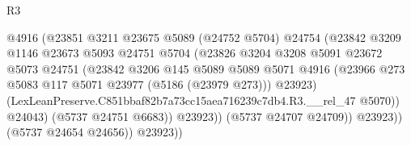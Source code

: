 \begin{lexlean}{R3}
\begin{coremodule}
                                            @4916
                                            (@23851
                                              @3211
                                              @23675
                                              @5089
                                              (@24752 @5704)
                                              @24754
                                              (@23842
                                                @3209
                                                @1146
                                                @23673
                                                @5093
                                                @24751
                                                @5704
                                                (@23826
                                                  @3204
                                                  @3208
                                                  @5091
                                                  @23672
                                                  @5073
                                                  @24751
                                                  (@23842
                                                    @3206
                                                    @145
                                                    @5089
                                                    @5089
                                                    @5071
                                                    @4916
                                                    (@23966
                                                      @273
                                                      @5083
                                                      @117
                                                      @5071
                                                      @23977
                                                      (@5186 (@23979 @273)))
                                                    @23923)
                                                  (LexLeanPreserve.C851bbaf82b7a73cc15aea716239c7db4.R3.__rel_47
                                                    @5070))
                                                @24043)
                                              (@5737 @24751 @6683))
                                            @23923))
                                        (@5737 @24707 @24709))
                                      @23923))
                                  (@5737 @24654 @24656))
                                @23923))

\end{coremodule}
\end{lexlean}
